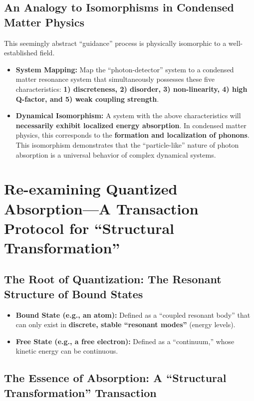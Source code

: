 \documentclass[11pt, a4paper]{article}
\begin{document}
\subsection{An Analogy to Isomorphisms in Condensed Matter Physics}

This seemingly abstract ``guidance'' process is physically isomorphic to a well-established field.

\begin{itemize}
    \item \textbf{System Mapping:} Map the ``photon-detector'' system to a condensed matter resonance system that simultaneously possesses these five characteristics: \textbf{1) discreteness, 2) disorder, 3) non-linearity, 4) high Q-factor, and 5) weak coupling strength}.
    \item \textbf{Dynamical Isomorphism:} A system with the above characteristics will \textbf{necessarily exhibit localized energy absorption}. In condensed matter physics, this corresponds to the \textbf{formation and localization of phonons}. This isomorphism demonstrates that the ``particle-like'' nature of photon absorption is a universal behavior of complex dynamical systems.
\end{itemize}

\section{Re-examining Quantized Absorption---A Transaction Protocol for ``Structural Transformation''}

\subsection{The Root of Quantization: The Resonant Structure of Bound States}

\begin{itemize}
    \item \textbf{Bound State (e.g., an atom):} Defined as a ``coupled resonant body'' that can only exist in \textbf{discrete, stable ``resonant modes''} (energy levels).
    \item \textbf{Free State (e.g., a free electron):} Defined as a ``continuum,'' whose kinetic energy can be continuous.
\end{itemize}

\subsection{The Essence of Absorption: A ``Structural Transformation'' Transaction}
\end{document}
